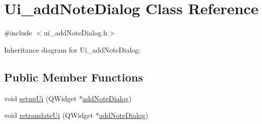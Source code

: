\hypertarget{classUi__addNoteDialog}{}\section{Ui\+\_\+add\+Note\+Dialog Class Reference}
\label{classUi__addNoteDialog}


{\ttfamily \#include $<$ui\+\_\+add\+Note\+Dialog.\+h$>$}



Inheritance diagram for Ui\+\_\+add\+Note\+Dialog\+:
\subsection*{Public Member Functions}
\begin{DoxyCompactItemize}
\item 
void \hyperlink{classUi__addNoteDialog_a2487f1cd1542da959f06b7412e80ef0b}{setup\+Ui} (Q\+Widget $\ast$\hyperlink{classaddNoteDialog}{add\+Note\+Dialog})
\item 
void \hyperlink{classUi__addNoteDialog_aab12c63dbd7ceae65cefd5be2a09c2ab}{retranslate\+Ui} (Q\+Widget $\ast$\hyperlink{classaddNoteDialog}{add\+Note\+Dialog})
\end{DoxyCompactItemize}
